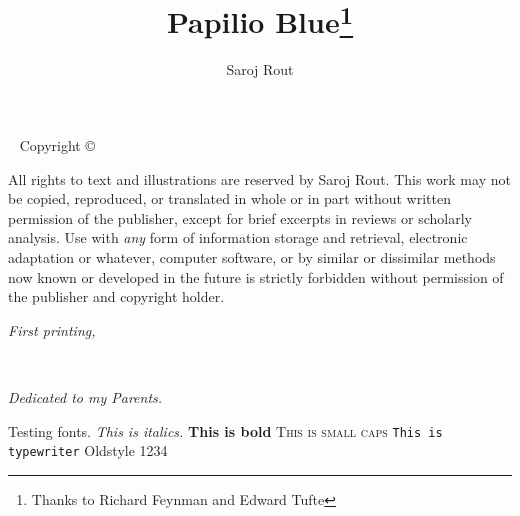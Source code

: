 \documentclass{tufte-book}
\title{Papilio Blue\thanks{Thanks to Richard Feynman and     Edward Tufte}}
\author[Saroj Rout]{Saroj Rout}
\begin{document}
\frontmatter


\newpage\thispagestyle{empty}

\vfill
{}
\vfill

\vfill

\maketitle


\newpage
\begin{fullwidth}
~\vfill
\thispagestyle{empty}
\setlength{\parindent}{0pt}
\setlength{\parskip}{\baselineskip}
Copyright \copyright\ \the\year\ \thanklessauthor

\par{}

\par{}

\par All rights to text and illustrations are reserved by Saroj Rout. This work may not be copied, reproduced, or translated in whole or in part without written permission of the publisher, except for brief excerpts in reviews or scholarly analysis. Use with {\it any} form of information storage and retrieval, electronic adaptation or whatever, computer software, or by similar or dissimilar methods now known or developed in the future is strictly forbidden without permission of the publisher and copyright holder.

\par\textit{First printing, \monthyear}
\end{fullwidth}




\cleardoublepage
~\vfill
\begin{doublespace}
\noindent\fontsize{18}{22}\selectfont\itshape
\nohyphenation
Dedicated to my Parents.
\end{doublespace}
\vfill
\vfill

Testing fonts.
\textit{This is italics.}
\textbf{This is bold}
\textsc{This is small caps}
\texttt{This is typewriter}
Oldstyle 1234
%


%
%


\end{document}
